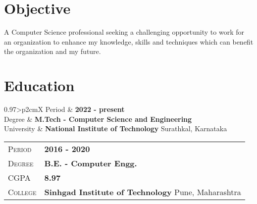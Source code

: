 \documentclass[a4paper]{scrartcl} %
\newcommand{\gray}{\rowcolor[gray]{.90}} %
\begin{document}
\begin{center} %


{\fontsize{36}{36}} %

\vspace{1.5cm} %


\section{Objective}

A Computer Science professional seeking a challenging opportunity to work for an organization to enhance my knowledge, skills and techniques which can benefit the organization and my
future.



\section{Education}

\begin{tabularx}{0.97\linewidth}{>{\raggedleft\scshape}p{2cm}X}
	\gray Period & \textbf{2022 - present}\\
	\gray Degree & \textbf{M.Tech - Computer Science and Engineering}\\
	\gray University & \textbf{National Institute of Technology} \hfill Surathkal, Karnataka\\
\end{tabularx}

\vspace{12pt}

\begin{tabularx}{0.97\linewidth}{>{\raggedleft\scshape}p{2cm}X}
	\gray Period & \textbf{2016 - 2020}\\
	\gray Degree & \textbf{B.E. - Computer Engg.}\\
	\gray CGPA & \textbf{8.97}\\
	\gray College & \textbf{Sinhgad Institute of Technology} \hfill Pune, Maharashtra\\
\end{tabularx}


\end{center}
\end{document}
